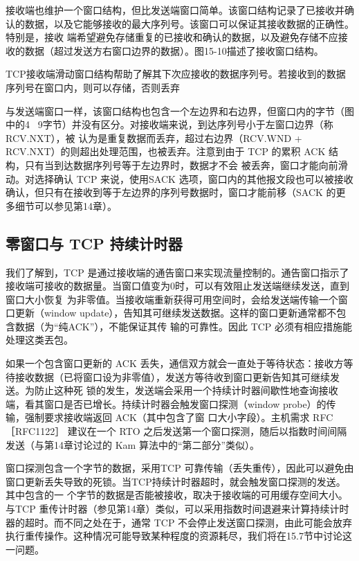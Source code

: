 接收端也维护一个窗口结构，但比发送端窗口简单。该窗口结构记录了已接收并确认的数据，以及它能够接收的最大序列号。该窗口可以保证其接收数据的正确性。特别是，接收
端希望避免存储重复的已接收和确认的数据，以及避免存储不应接收的数据（超过发送方右窗口边界的数据）。图15-10描述了接收窗口结构。

TCP接收端滑动窗口结构帮助了解其下次应接收的数据序列号。若接收到的数据序列号在窗口内，则可以存储，否则丢弃

与发送端窗口一样，该窗口结构也包含一个左边界和右边界，但窗口内的字节（图中的4 ~9字节）并没有区分。对接收端来说，到达序列号小于左窗口边界（称 RCV.NXT），被
认为是重复数据而丢弃，超过右边界（RCV.WND + RCV.NXT）的则超出处理范围，也被丢弃。注意到由于 TCP 的累积 ACK 结构，只有当到达数据序列号等于左边界时，数据才不会
被丢奔，窗口才能向前滑动。对选择确认 TCP 来说，使用SACK 选项，窗口内的其他报文段也可以被接收确认，但只有在接收到等于左边界的序列号数据时，窗口才能前移（SACK
的更多细节可以参见第14章）。

\subsection{零窗口与 TCP 持续计时器}

我们了解到，TCP 是通过接收端的通告窗口来实现流量控制的。通告窗口指示了接收端可接收的数据量。当窗口值变为0时，可以有效阻止发送端继续发送，直到窗口大小恢复
为非零值。当接收端重新获得可用空间时，会给发送端传输一个窗口更新（window update），告知其可继续发送数据。这样的窗口更新通常都不包含数据（为“纯ACK”），不能保证其传
输的可靠性。因此 TCP 必须有相应措施能处理这类丟包。

如果一个包含窗口更新的 ACK 丢失，通信双方就会一直处于等待状态：接收方等待接收数据（已将窗口设为非零值），发送方等待收到窗口更新告知其可继续发送。为防止这种死
锁的发生，发送端会采用一个持续计时器间歇性地查询接收端，看其窗口是否已增长。持续计时器会触发窗口探测（window probe）的传输，强制要求接收端返回 ACK（其中包含了窗
口大小字段）。主机需求 RFC ［RFC1122］ 建议在一个 RTO 之后发送第一个窗口探测，随后以指数时间间隔发送（与第14章讨论过的 Kam 算法中的“第二部分”类似）。

窗口探测包含一个字节的数据，采用TCP 可靠传输（丢失重传），因此可以避免由窗口更新丢失导致的死锁。当TCP持续计时器超时，就会触发窗口探测的发送。其中包含的一
个字节的数据是否能被接收，取决于接收端的可用缓存空间大小。与TCP 重传计时器（参见第14章）类似，可以采用指数时间退避来计算持续计时器的超时。而不同之处在于，通常
TCP 不会停止发送窗口探测，由此可能会放弃执行重传操作。这种情况可能导致某种程度的资源耗尽，我们将在15.7节中讨论这一问题。

